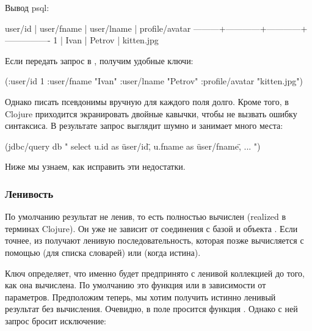 Вывод psql:

\begin{english}
  \begin{text}
 user/id | user/fname | user/lname | profile/avatar
---------+------------+------------+----------------
       1 | Ivan       | Petrov     | kitten.jpg
  \end{text}
\end{english}

Если передать запрос в , получим удобные ключи:

\begin{english}
  \begin{clojure}
({:user/id 1
  :user/fname "Ivan"
  :user/lname "Petrov"
  :profile/avatar "kitten.jpg"})
  \end{clojure}
\end{english}

Однако писать псевдонимы вручную для каждого поля долго. Кроме того, в Clojure приходится экранировать двойные кавычки, чтобы не вызвать ошибку синтаксиса. В результате запрос выглядит шумно и занимает много места:

\begin{english}
  \begin{clojure}
(jdbc/query db "
select
u.id as \"user/id\",
u.fname as \"user/fname\",
...
")
  \end{clojure}
\end{english}

Ниже мы узнаем, как исправить эти недостатки.

\subsubsection{Ленивость}

По умолчанию результат  не ленив, то есть полностью вычислен (realized в терминах Clojure). Он уже не зависит от соединения с базой и объекта . Если точнее, из  получают ленивую последовательность, которая позже вычисляется с помощью  (для списка словарей) или  (когда  истина).

Ключ  определяет, что именно будет предпринято с ленивой коллекцией до того, как она вычислена. По умолчанию это функция  или  в зависимости от параметров. Предположим теперь, мы хотим получить истинно ленивый результат без вычисления. Очевидно, в поле  просится функция . Однако с ней запрос бросит исключение:

